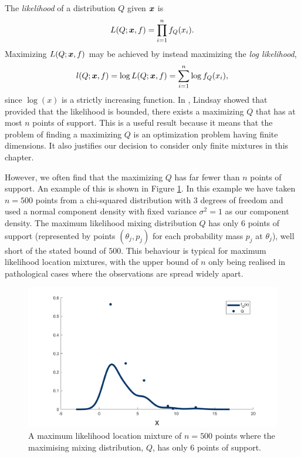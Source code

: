 	The \emph{likelihood} of a distribution $Q$ given ${\bm{{x}}}$ is 
	\begin{equation}
		L(Q;{\bm{{x}}}, f) = \prod_{i = 1}^n f_Q(x_i).
	\end{equation}
	Maximizing $L(Q;{\bm{{x}}}, f)$ may be achieved by instead maximizing the \emph{log likelihood},
	\begin{equation}
		l(Q; {\bm{{x}}}, f) = \log L(Q; {\bm{{x}}}, f) = \sum_{i = 1}^n \log f_Q(x_i),
		\label{eq:loglikelihood}
	\end{equation}
	since $\log(x)$ is a strictly increasing function. In \cite{Lindsay1983-tf}, Lindsay showed that provided that the likelihood is bounded, there exists a maximizing $Q$ that has at most $n$ points of support. This is a useful result because it means that the problem of finding a maximizing $Q$ is an optimization problem having finite dimensions. It also justifies our decision to consider only finite mixtures in this chapter.

	However, we often find that the maximizing $Q$ has far fewer than $n$ points of support. An example of this is shown in Figure \ref{fig:chi2 n500 motivation}. In this example we have taken $n = 500$ points from a chi-squared distribution with 3 degrees of freedom and used a normal component density with fixed variance $\sigma^2 = 1$ as our component density. The maximum likelihood mixing distribution $Q$ has only 6 points of support (represented by points $(\theta_j, p_j)$ for each probability mass $p_j$ at $\theta_j$), well short of the stated bound of $500$. This behaviour is typical for maximum likelihood location mixtures, with the upper bound of $n$ only being realised in pathological cases where the observations are spread widely apart.

	\begin{figure}
		\centering
		\includegraphics[width = \textwidth]{Figures/Mixtures/chi2_n500_motivation.png}
		\caption{A maximum likelihood location mixture of $n = 500$ points where the maximising mixing distribution, $Q$, has only 6 points of support.}
		\label{fig:chi2 n500 motivation}
	\end{figure}

